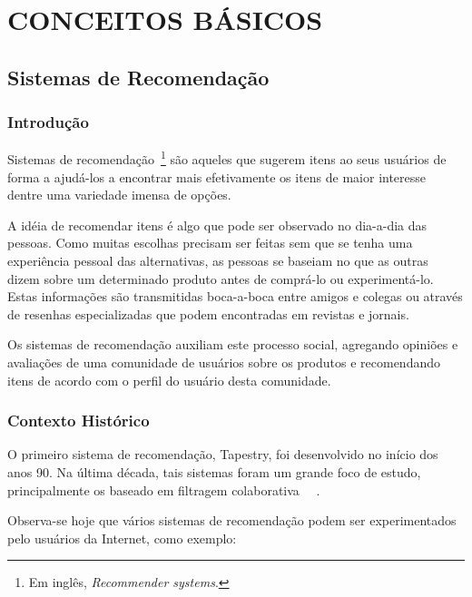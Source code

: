 \chapter{CONCEITOS BÁSICOS} %
\label{cha:conceitos_basicos}

\section{Sistemas de Recomendação}
\label{sec:sistemas_de_recomendacao}


\subsection{Introdução}
Sistemas de recomendação~\footnote{Em inglês, \textit{Recommender systems}.} são aqueles que sugerem itens ao seus usuários de forma a ajudá-los a encontrar mais efetivamente os itens de maior interesse dentre uma variedade imensa de opções.

A idéia de recomendar itens é algo que pode ser observado no dia-a-dia das pessoas. Como muitas escolhas precisam ser feitas sem que se tenha uma experiência pessoal das alternativas, as pessoas se baseiam no que as outras dizem sobre um determinado produto antes de comprá-lo ou experimentá-lo. Estas informações são transmitidas boca-a-boca entre amigos e colegas ou através de resenhas especializadas que podem encontradas em revistas e jornais.

Os sistemas de recomendação auxiliam este processo social, agregando opiniões e avaliações de uma comunidade de usuários sobre os produtos e recomendando itens de acordo com o perfil do usuário desta comunidade.

\subsection{Contexto Histórico}
O primeiro sistema de recomendação, Tapestry\cite{Goldberg92}, foi desenvolvido no início dos anos 90. Na última década, tais sistemas foram um grande foco de estudo, principalmente os baseado em filtragem colaborativa ~\cite{Resnick97}~\cite{Herlocker04}.

Observa-se hoje que vários sistemas de recomendação podem ser experimentados pelo usuários da Internet, como exemplo:

